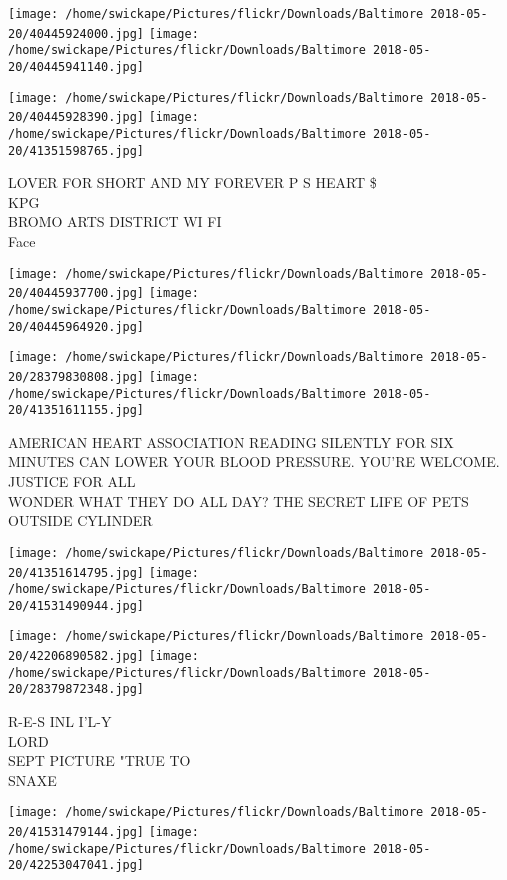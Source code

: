 \documentclass[10pt,letterpaper]{article}
\begin{document}
\texttt{[image: /home/swickape/Pictures/flickr/Downloads/Baltimore 2018-05-20/40445924000.jpg]}
\texttt{[image: /home/swickape/Pictures/flickr/Downloads/Baltimore 2018-05-20/40445941140.jpg]}

\texttt{[image: /home/swickape/Pictures/flickr/Downloads/Baltimore 2018-05-20/40445928390.jpg]}
\texttt{[image: /home/swickape/Pictures/flickr/Downloads/Baltimore 2018-05-20/41351598765.jpg]}

LOVER FOR SHORT AND MY FOREVER P S HEART \$\\
KPG\\
BROMO ARTS DISTRICT WI FI\\
Face
\pagebreak

\texttt{[image: /home/swickape/Pictures/flickr/Downloads/Baltimore 2018-05-20/40445937700.jpg]}
\texttt{[image: /home/swickape/Pictures/flickr/Downloads/Baltimore 2018-05-20/40445964920.jpg]}

\texttt{[image: /home/swickape/Pictures/flickr/Downloads/Baltimore 2018-05-20/28379830808.jpg]}
\texttt{[image: /home/swickape/Pictures/flickr/Downloads/Baltimore 2018-05-20/41351611155.jpg]}

AMERICAN HEART ASSOCIATION READING SILENTLY FOR SIX MINUTES CAN LOWER YOUR BLOOD PRESSURE.  YOU'RE WELCOME.\\
JUSTICE FOR ALL\\
WONDER WHAT THEY DO ALL DAY?  THE SECRET LIFE OF PETS\\
OUTSIDE CYLINDER
\pagebreak

\texttt{[image: /home/swickape/Pictures/flickr/Downloads/Baltimore 2018-05-20/41351614795.jpg]}
\texttt{[image: /home/swickape/Pictures/flickr/Downloads/Baltimore 2018-05-20/41531490944.jpg]}

\texttt{[image: /home/swickape/Pictures/flickr/Downloads/Baltimore 2018-05-20/42206890582.jpg]}
\texttt{[image: /home/swickape/Pictures/flickr/Downloads/Baltimore 2018-05-20/28379872348.jpg]}

R{-}E{-}S INL I'L{-}Y\\
LORD\\
SEPT PICTURE "TRUE TO\\
SNAXE
\pagebreak

\texttt{[image: /home/swickape/Pictures/flickr/Downloads/Baltimore 2018-05-20/41531479144.jpg]}
\texttt{[image: /home/swickape/Pictures/flickr/Downloads/Baltimore 2018-05-20/42253047041.jpg]}
\end{document}
